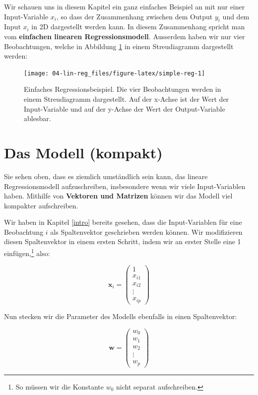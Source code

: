 \documentclass[
]{book}
\begin{document}
Wir schauen uns in diesem Kapitel ein ganz einfaches Beispiel an mit nur einer Input-Variable \(x_i\), so dass der Zusammenhang zwischen dem Output \(y_i\) und dem Input \(x_i\) in 2D dargestellt werden kann. In diesem Zusammenhang spricht man vom \textbf{einfachen linearen Regressionsmodell}. Ausserdem haben wir nur vier Beobachtungen, welche in Abbildung \ref{fig:simple-reg} in einem Streudiagramm dargestellt werden:

\begin{figure}

{\centering \texttt{[image: 04-lin-reg\_files/figure-latex/simple-reg-1]} 

}

\caption{Einfaches Regressionsbeispiel. Die vier Beobachtungen werden in einem Streudiagramm dargestellt. Auf der x-Achse ist der Wert der Input-Variable und auf der y-Achse der Wert der Output-Variable ablesbar.}\label{fig:simple-reg}
\end{figure}

\hypertarget{das-modell-kompakt}{%
\section{Das Modell (kompakt)}\label{das-modell-kompakt}}

Sie sehen oben, dass es ziemlich umständlich sein kann, das lineare Regressionsmodell aufzuschreiben, insbesondere wenn wir viele Input-Variablen haben. Mithilfe von \textbf{Vektoren und Matrizen} können wir das Modell viel kompakter aufschreiben.

Wir haben in Kapitel \ref{intro} bereits gesehen, dass die Input-Variablen für eine Beobachtung \(i\) als Spaltenvektor geschrieben werden können. Wir modifizieren diesen Spaltenvektor in einem ersten Schritt, indem wir an erster Stelle eine 1 einfügen,\footnote{So müssen wir die Konstante \(w_0\) nicht separat aufschreiben.} also:

\[\mathbf{x}_i=\begin{pmatrix} 1\\ x_{i1} \\ x_{i2} \\ \vdots \\ x_{ip} \end{pmatrix}\]

Nun stecken wir die Parameter des Modells ebenfalls in einen Spaltenvektor:

\[\mathbf{w}=\begin{pmatrix} w_0 \\ w_1 \\ w_2 \\ \vdots \\ w_p \end{pmatrix}\]
\end{document}
